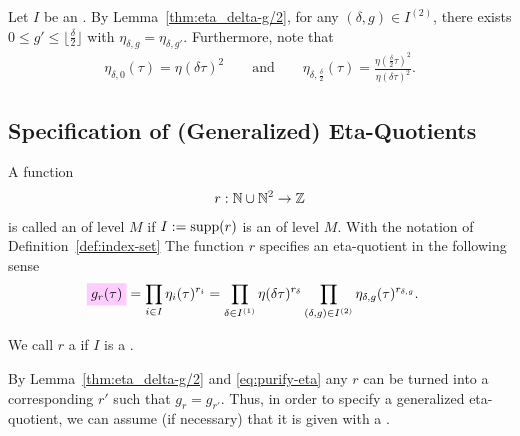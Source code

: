 \documentclass{article}
\begin{document}
Let $I$ be an .
%
By Lemma~\ref{thm:eta_delta-g/2}, for any $(\delta, g) \in I^{(2)}$,
there exists $0 \le g' \le \lfloor\frac{\delta}{2}\rfloor$ with
$\eta_{\delta,g}=\eta_{\delta,g'}$.
Furthermore, note that
\begin{gather}
  \eta_{\delta,0}(\tau)
  = \eta(\delta\tau)^2
  \qquad\text{and}\qquad
  \eta_{\delta,\frac{\delta}{2}}(\tau)
  = \frac{\eta(\frac{\delta}{2}\tau)^2}{\eta(\delta\tau)^2}.
  \label{eq:purify-eta}
\end{gather}


\subsection{Specification of (Generalized) Eta-Quotients}

\begin{Definition}
  \label{def:eta-specification}
  A function
  \begin{gather}
    r: \mathbb{N} \cup \mathbb{N}^2 \to \mathbb{Z}
  \end{gather}
  is called an  of level $M$ if
  $I := \operatorname{supp}(r)$ is an  of level $M$.
%
  With the notation of Definition~\ref{def:index-set} The function $r$
  specifies an eta-quotient in the following sense
  \begin{align}
    \defineNotation[g-r(tau)]{g_r(\tau)}
    &= \prod_{i\in I} \eta_i(\tau)^{r_i}
      = \prod_{\delta\in I^{(1)}} \eta(\delta\tau)^{r_\delta}
      \prod_{(\delta,g)\in I^{(2)}} \eta_{\delta,g}(\tau)^{r_{\delta,g}}.
      \label{eq:g_r(tau)}
  \end{align}

  We call $r$ a  if $I$ is a
  .
\end{Definition}

By Lemma~\ref{thm:eta_delta-g/2} and \eqref{eq:purify-eta} any
 $r$ can be turned into a corresponding
 $r'$ such that $g_r= g_{r'}$.
%
Thus, in order to specify a generalized eta-quotient, we can assume
(if necessary) that it is given with a .
\end{document}
